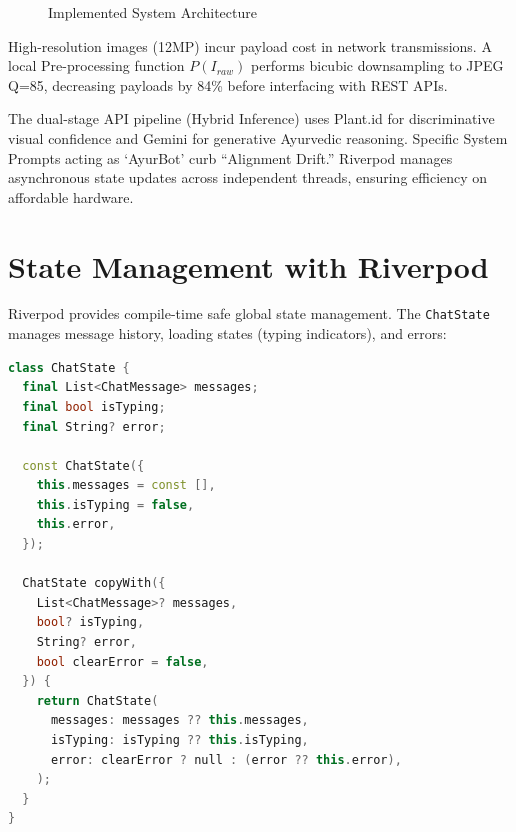 \begin{figure}[!htbp]
\begin{mdframed}
{%
  }
\end{mdframed}
\caption{Implemented System Architecture}
\end{figure}

\justify
High-resolution images (12MP) incur payload cost in network transmissions. A local
Pre-processing function $P(I_{raw})$ performs bicubic downsampling to JPEG Q=85,
decreasing payloads by 84\% before interfacing with REST APIs.

The dual-stage API pipeline (Hybrid Inference) uses Plant.id for discriminative visual
confidence and Gemini for generative Ayurvedic reasoning. Specific System Prompts acting
as `AyurBot' curb ``Alignment Drift.'' Riverpod manages asynchronous state updates
across independent threads, ensuring efficiency on affordable hardware.

\newpage
\section{State Management with Riverpod}
\justify
Riverpod provides compile-time safe global state management. The \texttt{ChatState}
manages message history, loading states (typing indicators), and errors:

\begin{lstlisting}[language=C++]
class ChatState {
  final List<ChatMessage> messages;
  final bool isTyping;
  final String? error;

  const ChatState({
    this.messages = const [],
    this.isTyping = false,
    this.error,
  });

  ChatState copyWith({
    List<ChatMessage>? messages,
    bool? isTyping,
    String? error,
    bool clearError = false,
  }) {
    return ChatState(
      messages: messages ?? this.messages,
      isTyping: isTyping ?? this.isTyping,
      error: clearError ? null : (error ?? this.error),
    );
  }
}
\end{lstlisting}

